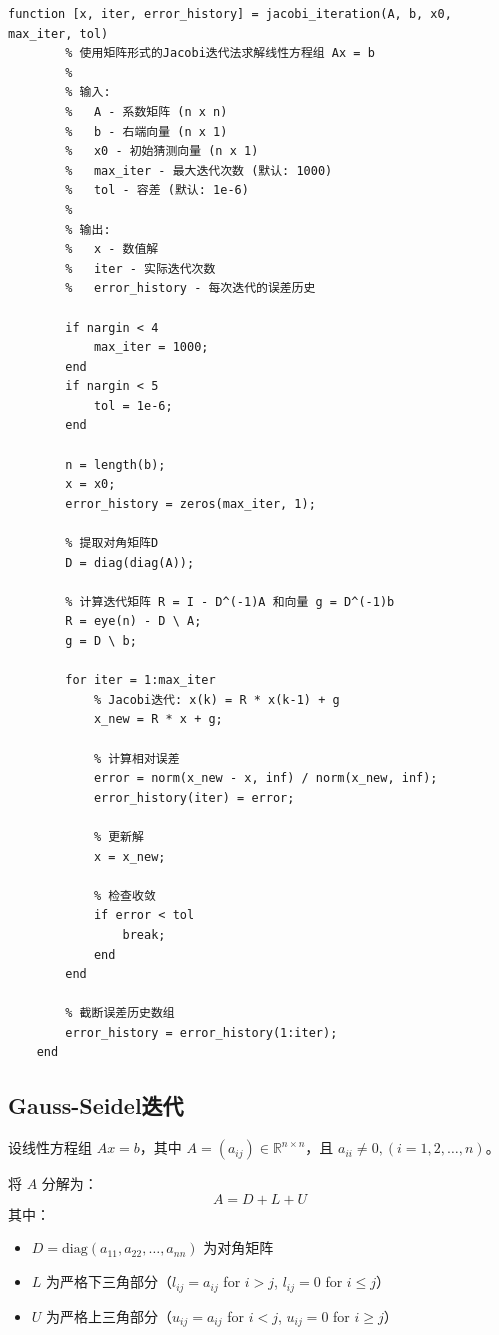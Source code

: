\begin{lstlisting}[caption={jacobi\_iteration.m}]
    function [x, iter, error_history] = jacobi_iteration(A, b, x0, max_iter, tol)
        % 使用矩阵形式的Jacobi迭代法求解线性方程组 Ax = b
        %
        % 输入:
        %   A - 系数矩阵 (n x n)
        %   b - 右端向量 (n x 1)
        %   x0 - 初始猜测向量 (n x 1)
        %   max_iter - 最大迭代次数 (默认: 1000)
        %   tol - 容差 (默认: 1e-6)
        %
        % 输出:
        %   x - 数值解
        %   iter - 实际迭代次数
        %   error_history - 每次迭代的误差历史

        if nargin < 4
            max_iter = 1000;
        end
        if nargin < 5
            tol = 1e-6;
        end
        
        n = length(b);
        x = x0;
        error_history = zeros(max_iter, 1);
        
        % 提取对角矩阵D
        D = diag(diag(A));
        
        % 计算迭代矩阵 R = I - D^(-1)A 和向量 g = D^(-1)b
        R = eye(n) - D \ A;
        g = D \ b;
        
        for iter = 1:max_iter
            % Jacobi迭代: x(k) = R * x(k-1) + g
            x_new = R * x + g;
            
            % 计算相对误差
            error = norm(x_new - x, inf) / norm(x_new, inf);
            error_history(iter) = error;
            
            % 更新解
            x = x_new;
            
            % 检查收敛
            if error < tol
                break;
            end
        end
        
        % 截断误差历史数组
        error_history = error_history(1:iter);
    end
\end{lstlisting}

\subsection{Gauss-Seidel迭代}

设线性方程组 $Ax = b$，其中 $A = (a_{ij}) \in \mathbb{R}^{n \times n}$，且 $a_{ii} \neq 0, (i = 1, 2, \dots, n)$。

将 $A$ 分解为：
\[
A = D + L + U
\]
其中：
\begin{itemize}
    \item $D = \text{diag}(a_{11}, a_{22}, \dots, a_{nn})$ 为对角矩阵
    \item $L$ 为严格下三角部分（$l_{ij} = a_{ij}$ for $i > j$, $l_{ij} = 0$ for $i \leq j$）
    \item $U$ 为严格上三角部分（$u_{ij} = a_{ij}$ for $i < j$, $u_{ij} = 0$ for $i \geq j$）
\end{itemize}

